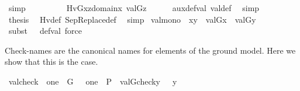 \begin{isabellebody}
\ simp\isanewline
\ \ \isamarkupfalse%
\isanewline
\ \ \isamarkupfalse%
\ {\isachardoublequoteopen}\ {\isachardot}{\kern0pt}{\isachardot}{\kern0pt}{\isachardot}{\kern0pt}\ {\isacharequal}{\kern0pt}\ Hv{\isacharparenleft}{\kern0pt}G{\isacharcomma}{\kern0pt}x{\isacharcomma}{\kern0pt}{\isasymlambda}z{\isasymin}domain{\isacharparenleft}{\kern0pt}x{\isacharparenright}{\kern0pt}{\isachardot}{\kern0pt}\ val{\isacharparenleft}{\kern0pt}G{\isacharcomma}{\kern0pt}z{\isacharparenright}{\kern0pt}{\isacharparenright}{\kern0pt}{\isachardoublequoteclose}\isanewline
\ \ \ \ \isamarkupfalse%
\ aux{\isacharunderscore}{\kern0pt}def{\isacharunderscore}{\kern0pt}val\ val{\isacharunderscore}{\kern0pt}def\ \isamarkupfalse%
\ simp\isanewline
\ \ \isamarkupfalse%
\isanewline
\ \ \isamarkupfalse%
\ {\isacharquery}{\kern0pt}thesis\ \isamarkupfalse%
\ Hv{\isacharunderscore}{\kern0pt}def\ SepReplace{\isacharunderscore}{\kern0pt}def\ \isamarkupfalse%
\ simp\isanewline
{}\isamarkupfalse%
%
\endisatagproof
{\isafoldproof}%
%
\isadelimproof
\isanewline
%
\endisadelimproof
\isanewline
{}\isamarkupfalse%
\ val{\isacharunderscore}{\kern0pt}mono\ {\isacharcolon}{\kern0pt}\ {\isachardoublequoteopen}x{\isasymsubseteq}y\ {\isasymLongrightarrow}\ val{\isacharparenleft}{\kern0pt}G{\isacharcomma}{\kern0pt}x{\isacharparenright}{\kern0pt}\ {\isasymsubseteq}\ val{\isacharparenleft}{\kern0pt}G{\isacharcomma}{\kern0pt}y{\isacharparenright}{\kern0pt}{\isachardoublequoteclose}\isanewline
%
\isadelimproof
\ \ %
\endisadelimproof
%
\isatagproof
{}\isamarkupfalse%
\ {\isacharparenleft}{\kern0pt}subst\ {\isacharparenleft}{\kern0pt}{}\ {}{\isacharparenright}{\kern0pt}\ def{\isacharunderscore}{\kern0pt}val{\isacharcomma}{\kern0pt}\ force{\isacharparenright}{\kern0pt}%
\endisatagproof
{\isafoldproof}%
%
\isadelimproof
%
\endisadelimproof
%
\begin{isamarkuptext}%
Check-names are the canonical names for elements of the
ground model. Here we show that this is the case.%
\end{isamarkuptext}\isamarkuptrue%
\isamarkupfalse%
\ valcheck\ {\isacharcolon}{\kern0pt}\ {\isachardoublequoteopen}one\ {\isasymin}\ G\ {\isasymLongrightarrow}\ \ one\ {\isasymin}\ P\ {\isasymLongrightarrow}\ val{\isacharparenleft}{\kern0pt}G{\isacharcomma}{\kern0pt}check{\isacharparenleft}{\kern0pt}y{\isacharparenright}{\kern0pt}{\isacharparenright}{\kern0pt}\ \ {\isacharequal}{\kern0pt}\ y{\isachardoublequoteclose}\isanewline

\end{isabellebody}
